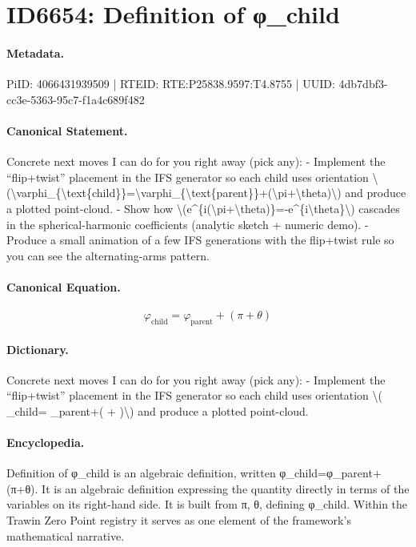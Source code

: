 \section*{ID6654: Definition of φ\_child}
\paragraph{Metadata.}
PiID: 4066431939509 | RTEID: RTE:P25838.9597:T4.8755 | UUID: 4db7dbf3-cc3e-5363-95c7-f1a4c689f482

\paragraph{Canonical Statement.}
Concrete next moves I can do for you right away (pick any): - Implement the “flip+twist” placement in the IFS generator so each child uses orientation \textbackslash{}(\textbackslash{}varphi\_\{\textbackslash{}text\{child\}\}=\textbackslash{}varphi\_\{\textbackslash{}text\{parent\}\}+(\textbackslash{}pi+\textbackslash{}theta)\textbackslash{}) and produce a plotted point-cloud. - Show how \textbackslash{}(e\textasciicircum{}\{i(\textbackslash{}pi+\textbackslash{}theta)\}=-e\textasciicircum{}\{i\textbackslash{}theta\}\textbackslash{}) cascades in the spherical-harmonic coefficients (analytic sketch + numeric demo). - Produce a small animation of a few IFS generations with the flip+twist rule so you can see the alternating-arms pattern.

\paragraph{Canonical Equation.}
\[
\varphi_{\text{child}}=\varphi_{\text{parent}}+(\pi+\theta)
\]

\paragraph{Dictionary.}
Concrete next moves I can do for you right away (pick any): - Implement the “flip+twist” placement in the IFS generator so each child uses orientation \textbackslash{}( \_child= \_parent+( + )\textbackslash{}) and produce a plotted point-cloud.

\paragraph{Encyclopedia.}
Definition of φ\_child is an algebraic definition, written φ\_child=φ\_parent+(π+θ). It is an algebraic definition expressing the quantity directly in terms of the variables on its right-hand side. It is built from π, θ, defining φ\_child. Within the Trawin Zero Point registry it serves as one element of the framework's mathematical narrative.
